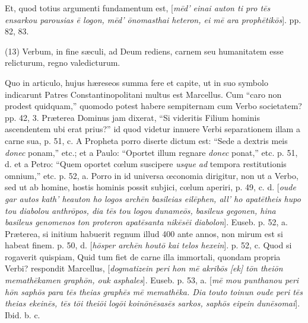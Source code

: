 Et,
quod totius argumenti fundamentum est, [\emph{m\={e}d' einai auton ti
pro t\={e}s ensarkou parousias \={e} logon, m\={e}d' \={o}nomasthai
heteron, ei m\={e} ara proph\={e}tik\={o}s}]. pp. 82, 83.

(13) Verbum, in fine sæculi,
ad Deum rediens, carnem seu humanitatem esse relicturum, regno
valedicturum.

Quo
in articulo, hujus hæreseos summa fere et capite, ut in suo symbolo
indicarunt Patres Constantinopolitani multus est Marcellus. Cum ``caro
non prodest quidquam,'' quomodo potest habere sempiternam cum Verbo
societatem? pp. 42, 3. Præterea Dominus jam dixerat, ``Si
videritis Filium hominis ascendentem ubi erat prius?'' id quod videtur
innuere Verbi separationem illam a carne sua, p. 51, c. A Propheta
porro diserte dictum est: ``Sede a dextris meis \emph{donec} ponam,''
etc.; et a Paulo: ``Oportet illum regnare \emph{donec} ponat,'' etc. p.
51, d. et a Petro: ``Quem oportet cœlum suscipere \emph{usque ad}
tempora restitutionis omnium,'' etc. p. 52, a. Porro in id universa œconomia
dirigitur, non ut a Verbo, sed ut ab homine, hostis hominis possit
subjici, cœlum aperiri, p. 49, c. d. [\emph{oude gar autos kath' heauton
ho logos arch\={e}n basileias eil\={e}phen, all' ho apat\={e}theis
hupo tou diabolou anthr\={o}pos, dia t\={e}s tou logou duname\={o}s,
basileus gegonen, hina basileus genomenos ton proteron apat\={e}santa
nik\={e}s\={e}i diabolon}]. Euseb. p. 52, a. Præterea, si
initium habuerit regnum illud 400 ante annos, non mirum est si habeat
finem. p. 50, d. [\emph{h\={o}sper arch\={e}n hout\={o} kai
telos hexein}]. p. 52, c. Quod si rogaverit quispiam, Quid tum fiet
de carne illa immortali, quondam propria Verbi? respondit Marcellus, [\emph{dogmatizein
peri hon m\={e} akrib\={o}s [ek] t\={o}n thei\={o}n memath\={e}kamen
graph\={o}n, ouk asphales}]. Euseb. p. 53, a. [\emph{m\={e} mou
punthanou peri h\={o}n saph\={o}s para t\={e}s theias graph\={e}s
m\={e} memath\={e}ka. Dia touto toinun oude peri t\={e}s
theias ekein\={e}s, t\={e}s t\={o}i thei\={o}i log\={o}i
koin\={o}n\={e}sas\={e}s sarkos, saph\={o}s eipein dun\={e}somai}].
Ibid. b. c.

